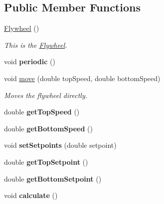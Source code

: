 \subsection*{Public Member Functions}
\begin{DoxyCompactItemize}
\item 
\mbox{\label{classfrc_1_1robot_1_1subsystems_1_1_flywheel_aaf74feb143596781760b2f5575ed3df3}} 
\mbox{\hyperlink{classfrc_1_1robot_1_1subsystems_1_1_flywheel_aaf74feb143596781760b2f5575ed3df3}{Flywheel}} ()
\begin{DoxyCompactList}\small\item\em This is the \mbox{\hyperlink{classfrc_1_1robot_1_1subsystems_1_1_flywheel}{Flywheel}}. \end{DoxyCompactList}\item 
\mbox{\label{classfrc_1_1robot_1_1subsystems_1_1_flywheel_ae82f78a02edcd069c6669ee650ce12f2}} 
void {\bfseries periodic} ()
\item 
void \mbox{\hyperlink{classfrc_1_1robot_1_1subsystems_1_1_flywheel_aa26e0c726e688afbbeee226084f447d8}{move}} (double top\+Speed, double bottom\+Speed)
\begin{DoxyCompactList}\small\item\em Moves the flywheel directly. \end{DoxyCompactList}\item 
\mbox{\label{classfrc_1_1robot_1_1subsystems_1_1_flywheel_a16962f32fb6cb7c74550615aeb4d224a}} 
double {\bfseries get\+Top\+Speed} ()
\item 
\mbox{\label{classfrc_1_1robot_1_1subsystems_1_1_flywheel_a759e5dea44f493d6a43d458d08229dd1}} 
double {\bfseries get\+Bottom\+Speed} ()
\item 
\mbox{\label{classfrc_1_1robot_1_1subsystems_1_1_flywheel_a06dbdb47ad00baa6bf69856b0c9e1246}} 
void {\bfseries set\+Setpoints} (double setpoint)
\item 
\mbox{\label{classfrc_1_1robot_1_1subsystems_1_1_flywheel_a79f59a76e03f8b05e821d22312e5b3e3}} 
double {\bfseries get\+Top\+Setpoint} ()
\item 
\mbox{\label{classfrc_1_1robot_1_1subsystems_1_1_flywheel_a0f7ff1b3e85b32e3037f9df89b7015fc}} 
double {\bfseries get\+Bottom\+Setpoint} ()
\item 
\mbox{\label{classfrc_1_1robot_1_1subsystems_1_1_flywheel_aa3694737386050d075ddc1d3d2f3ae07}} 
void {\bfseries calculate} ()
\end{DoxyCompactItemize}
